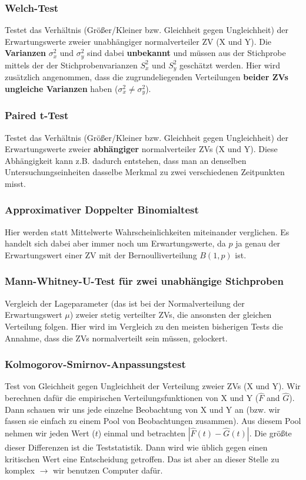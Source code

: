 \documentclass[a4paper]{article}
\begin{document}
\subsubsection{Welch-Test}\label{sec:Welch}
Testet das Verhältnis (Größer/Kleiner bzw. Gleichheit gegen Ungleichheit) der Erwartungswerte zweier unabhängiger normalverteiler ZV (X und Y). Die \textbf{Varianzen} $\sigma_x^2$ und $\sigma_y^2$ sind dabei \textbf{unbekannt} und müssen aus der Stichprobe mittels der der Stichprobenvarianzen $S_x^2$ und $S_y^2$ geschätzt werden. Hier wird zusätzlich angenommen, dass die zugrundeliegenden Verteilungen \textbf{beider ZVs ungleiche Varianzen} haben ($\sigma_x^2 \neq \sigma_y^2$). 

\subsubsection{Paired t-Test}\label{sec:paired}
Testet das Verhältnis (Größer/Kleiner bzw. Gleichheit gegen Ungleichheit) der Erwartungswerte zweier \textbf{abhängiger} normalverteiler ZVs (X und Y). Diese Abhängigkeit kann z.B. dadurch entstehen, dass man an denselben Untersuchungseinheiten dasselbe Merkmal zu zwei verschiedenen Zeitpunkten misst. 

\subsubsection{Approximativer Doppelter Binomialtest}\label{sec:bintest2}
Hier werden statt Mittelwerte Wahrscheinlichkeiten miteinander verglichen. Es handelt sich dabei aber immer noch um Erwartungswerte, da $p$ ja genau der Erwartungswert einer ZV mit der Bernoulliverteilung $B(1,p)$ ist.

\subsubsection{Mann-Whitney-U-Test für zwei unabhängige Stichproben}\label{sec:MWUtest}
Vergleich der Lageparameter (das ist bei der Normalverteilung der Erwartungswert $\mu$) zweier stetig verteilter ZVs, die ansonsten der gleichen Verteilung folgen. Hier wird im Vergleich zu den meisten bisherigen Tests die Annahme, dass die ZVs normalverteilt sein müssen, gelockert.

\subsubsection{Kolmogorov-Smirnov-Anpassungstest}\label{sec:KolSmi}
Test von Gleichheit gegen Ungleichheit der Verteilung zweier ZVs (X und Y). Wir berechnen dafür die empirischen Verteilungsfunktionen von X und Y ($\hat{F}$ and $\hat{G}$). Dann schauen wir uns jede einzelne Beobachtung von X und Y an (bzw. wir fassen sie einfach zu einem Pool von Beobachtungen zusammen). Aus diesem Pool nehmen wir jeden Wert ($t$) einmal und betrachten $|\hat{F}(t)-\hat{G}(t)|$. Die größte dieser Differenzen ist die Teststatistik. Dann wird wie üblich gegen einen kritischen Wert eine Entscheidung getroffen. Das ist aber an dieser Stelle zu komplex $\rightarrow$ wir benutzen Computer dafür.
\end{document}
